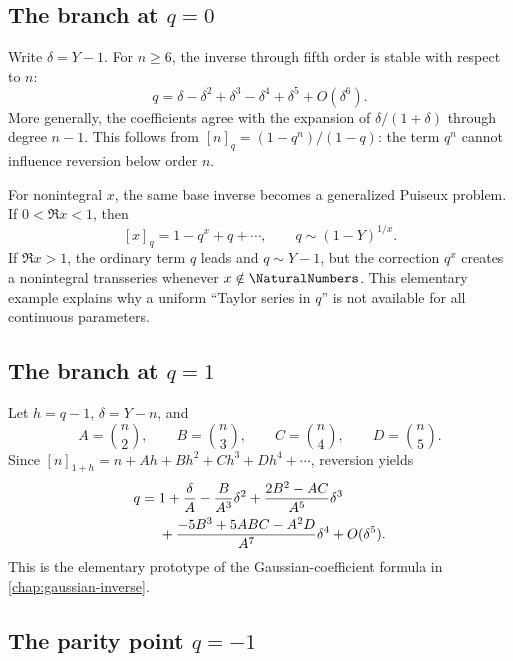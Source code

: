 \documentclass[11pt,a4paper,oneside,openany]{book}
\theoremstyle{definition}
\theoremstyle{remark}
\begin{document}
\subsection{The branch at \texorpdfstring{$q=0$}{q=0}}

Write \(\delta=Y-1\).  For \(n\ge6\), the inverse through fifth order is
stable with respect to \(n\):
\begin{equation}\label{eq:q-integer-qzero-inverse}
 q=\delta-\delta^2+\delta^3-\delta^4+\delta^5+O(\delta^6).
\end{equation}
More generally, the coefficients agree with the expansion of
\(\delta/(1+\delta)\) through degree \(n-1\).  This follows from
\(
[n]_q=(1-q^n)/(1-q)
\): the term \(q^n\) cannot influence reversion below order \(n\).

For nonintegral \(x\), the same base inverse becomes a generalized Puiseux
problem.  If \(0<\Re x<1\), then
\begin{equation}\label{eq:q-number-base-small-subunit}
 [x]_q=1-q^x+q+\cdots,
 \qquad
 q\sim (1-Y)^{1/x}.
\end{equation}
If \(\Re x>1\), the ordinary term \(q\) leads and \(q\sim Y-1\), but the
correction \(q^x\) creates a nonintegral transseries whenever \(x\notin\NaturalNumbers\).
This elementary example explains why a uniform ``Taylor series in \(q\)'' is
not available for all continuous parameters.

\subsection{The branch at \texorpdfstring{$q=1$}{q=1}}

Let \(h=q-1\), \(\delta=Y-n\), and
\begin{equation}\label{eq:q-integer-ABC}
 A=\binom n2,
 \qquad B=\binom n3,
 \qquad C=\binom n4,
 \qquad D=\binom n5.
\end{equation}
Since
\([n]_{1+h}=n+Ah+Bh^2+Ch^3+Dh^4+\cdots\), reversion yields
\begin{align}
 q={}&1+\frac{\delta}{A}-\frac{B}{A^3}\delta^2
 +\frac{2B^2-AC}{A^5}\delta^3 \notag\\
 &+\frac{-5B^3+5ABC-A^2D}{A^7}\delta^4+O(\delta^5).
 \label{eq:q-integer-qone-inverse}
\end{align}
This is the elementary prototype of the Gaussian-coefficient formula in
\cref{chap:gaussian-inverse}.

\subsection{The parity point \texorpdfstring{$q=-1$}{q=-1}}
\end{document}
